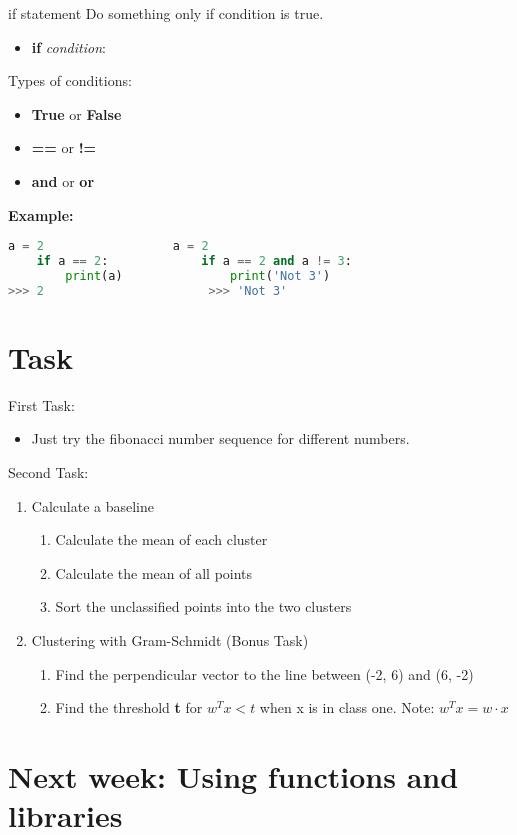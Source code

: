 \documentclass{beamer}
\begin{document}
\begin{frame}[fragile]{if statement}
    Do something only if condition is true.
    \begin{itemize}
        \item \textbf{if} \textit{condition}:
    \end{itemize}\pause
    Types of conditions:
    \begin{itemize}
        \item \textbf{True} or \textbf{False}
        \item \textbf{==} or \textbf{!=}
        \item \textbf{and} or \textbf{or}
    \end{itemize}\pause
    \textbf{Example:}
    \begin{lstlisting}[language=Python]
    a = 2                  a = 2
    if a == 2:             if a == 2 and a != 3:
        print(a)               print('Not 3')
>>> 2                       >>> 'Not 3'
    \end{lstlisting}
    
\end{frame}

\section{Task}

\begin{frame}
    First Task:
    \begin{itemize}
        \item Just try the fibonacci number sequence for different numbers.
    \end{itemize}
    Second Task:
    \begin{enumerate}
        \item Calculate a baseline
        \begin{enumerate}
            \item Calculate the mean of each cluster
            \item Calculate the mean of all points
            \item Sort the unclassified points into the two clusters
        \end{enumerate}
        \item Clustering with Gram-Schmidt (Bonus Task)
        \begin{enumerate}
            \item Find the perpendicular vector to the line between (-2, 6) and (6, -2)
            \item Find the threshold \textbf{t} for $w^Tx<t$ when x is in class one. Note: $w^Tx = w \cdot x$
        \end{enumerate}
    \end{enumerate}
\end{frame}

\section{Next week: Using functions and libraries}
\end{document}
